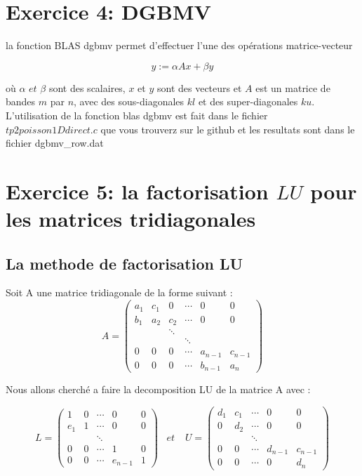 \documentclass[12pt]{report}
\begin{document}
\section{Exercice 4: DGBMV}

la fonction BLAS dgbmv permet d'effectuer l'une des opérations matrice-vecteur

$$y := \alpha Ax + \beta y$$

où $\alpha \, \, {et} \, \, \beta$ sont des scalaires, $x$ et $y$ sont des vecteurs et $A$ est un matrice de bandes $m$ par $n$, avec des sous-diagonales $kl$ et des super-diagonales $ku$.\\

L'utilisation de la fonction blas dgbmv est fait dans le fichier $tp2 poisson1D direct.c$ que vous trouverz sur le github et les resultats sont dans le fichier dgbmv\_row.dat

\section{Exercice 5: la factorisation $LU$ pour les matrices tridiagonales}



\subsection{La methode de factorisation LU}

Soit A une matrice tridiagonale de la forme suivant :
$$
A=\left(\begin{array}{cccccc}
a_{1} & c_{1} & 0 & \cdots & 0 & 0 \\
b_{1} & a_{2} & c_{2} & \cdots & 0 & 0 \\
& & \ddots & & & \\
& & & \ddots & & \\
0 & 0 & 0 & \cdots & a_{n-1} & c_{n-1} \\
0 & 0 & 0 & \cdots & b_{n-1} & a_{n}
\end{array}\right)
$$

Nous allons cherché a faire la decomposition LU de la matrice A avec :

$$
L=\left(\begin{array}{ccccc}
1 & 0 & \cdots & 0 & 0 \\
e_{1} & 1 & \cdots & 0 & 0 \\
& & \ddots & & \\
0 & 0 & \cdots & 1 & 0 \\
0 & 0 & \cdots & e_{n-1} & 1
\end{array}\right) \;\;\; et \;\;\;\ U = \left(\begin{array}{ccccc}
d_{1} & c_{1} & \cdots & 0 & 0 \\
0 & d_{2} & \cdots & 0 & 0 \\
& & \ddots & & \\
0 & 0 & \cdots & d_{n-1} & c_{n-1} \\
0 & 0 & \cdots & 0 & d_{n}
\end{array}\right)
$$\\
\end{document}
